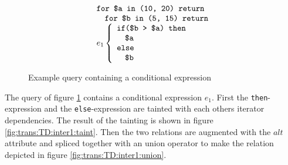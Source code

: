 \begin{myExample}
\begin{figure}[h]
\centering
\begin{equation*}
\begin{array}{l}
\mbox{\texttt{for \$a in (10, 20) return}} \\ \quad
\mbox{\texttt{for \$b in (5, 15) return}} \\ 
e_1 \left\{\begin{array}{l}
           \mbox{\texttt{if(\$b > \$a) then}} \\ \quad
           \mbox{\texttt{\$a}} \\ 
           \mbox{\texttt{else}} \\ \quad
           \mbox{\texttt{\$b}}
           \end{array}\right.
\end{array}
\end{equation*}
\caption{Example query containing a conditional expression \label{fig:trans:TD:condQue}}
\end{figure}

The query of figure \ref{fig:trans:TD:condQue} contains a conditional expression $e_1$. First the
\texttt{then}-expression and the \texttt{else}-expression are tainted with each
others iterator dependencies. The result of the tainting is shown in figure \ref{fig:trans:TD:inter1:taint}. Then the two relations are augmented
with the $alt$ attribute and spliced together with an \textsf{union} operator to make the relation depicted in
figure \ref{fig:trans:TD:inter1:union}.


\end{myExample}
